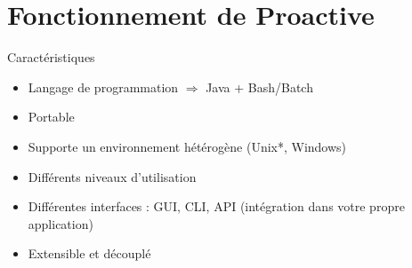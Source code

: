 \documentclass{beamer}
\begin{document}
\section[Fonctionnement]{Fonctionnement de Proactive}
\begin{frame}{Caractéristiques}
    \begin{itemize}
        \item Langage de programmation $\Longrightarrow$ Java + Bash/Batch
        \item Portable
        \item Supporte un environnement hétérogène (Unix*, Windows)%
        \item Différents niveaux d'utilisation %
        \item Différentes interfaces : GUI, CLI, API (intégration dans votre propre application)
        \item Extensible et découplé
    \end{itemize}

\end{frame}
\end{document}
